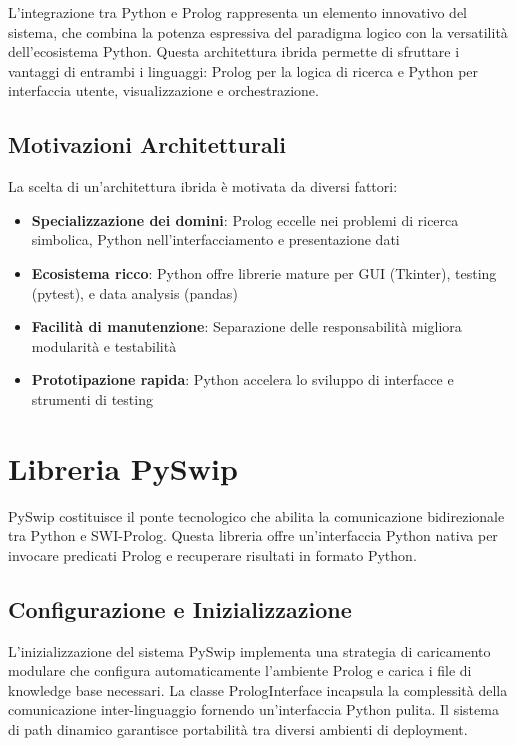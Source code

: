 \documentclass[12pt,a4paper]{report}
\theoremstyle{definition}
\begin{document}
L'integrazione tra Python e Prolog rappresenta un elemento innovativo del sistema, che combina la potenza espressiva del paradigma logico con la versatilità dell'ecosistema Python. Questa architettura ibrida permette di sfruttare i vantaggi di entrambi i linguaggi: Prolog per la logica di ricerca e Python per interfaccia utente, visualizzazione e orchestrazione.

\subsection{Motivazioni Architetturali}

La scelta di un'architettura ibrida è motivata da diversi fattori:

\begin{itemize}
    \item \textbf{Specializzazione dei domini}: Prolog eccelle nei problemi di ricerca simbolica, Python nell'interfacciamento e presentazione dati
    \item \textbf{Ecosistema ricco}: Python offre librerie mature per GUI (Tkinter), testing (pytest), e data analysis (pandas)
    \item \textbf{Facilità di manutenzione}: Separazione delle responsabilità migliora modularità e testabilità
    \item \textbf{Prototipazione rapida}: Python accelera lo sviluppo di interfacce e strumenti di testing
\end{itemize}

\section{Libreria PySwip}

PySwip costituisce il ponte tecnologico che abilita la comunicazione bidirezionale tra Python e SWI-Prolog. Questa libreria offre un'interfaccia Python nativa per invocare predicati Prolog e recuperare risultati in formato Python.

\subsection{Configurazione e Inizializzazione}

L'inizializzazione del sistema PySwip implementa una strategia di caricamento modulare che configura automaticamente l'ambiente Prolog e carica i file di knowledge base necessari. La classe PrologInterface incapsula la complessità della comunicazione inter-linguaggio fornendo un'interfaccia Python pulita. Il sistema di path dinamico garantisce portabilità tra diversi ambienti di deployment.
\end{document}
